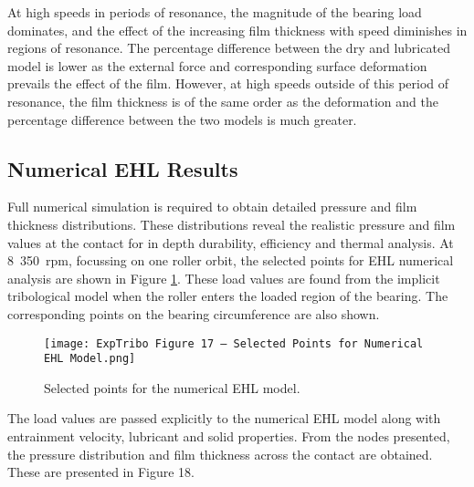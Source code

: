 At high speeds in periods of resonance, the magnitude of the bearing load dominates, and the effect of the increasing film thickness with speed diminishes in regions of resonance. The percentage difference between the dry and lubricated model is lower as the external force and corresponding surface deformation prevails the effect of the film. However, at high speeds outside of this period of resonance, the film thickness is of the same order as the deformation and the percentage difference between the two models is much greater.  

\subsection{Numerical EHL Results}

Full numerical simulation is required to obtain detailed pressure and film thickness distributions. These distributions reveal the realistic pressure and film values at the contact for in depth durability, efficiency and thermal analysis. At 8~350~rpm, focussing on one roller orbit, the selected points for EHL numerical analysis are shown in Figure \ref{Selected points for the numerical EHL model}. These load values are found from the implicit tribological model when the roller enters the loaded region of the bearing. The corresponding points on the bearing circumference are also shown. 

\begin{figure}
	\centering
	\texttt{[image: ExpTribo Figure 17 – Selected Points for Numerical EHL Model.png]}
	\caption{Selected points for the numerical EHL model.}
	\label{Selected points for the numerical EHL model}
\end{figure} 

The load values are passed explicitly to the numerical EHL model along with entrainment velocity, lubricant and solid properties. From the nodes presented, the pressure distribution and film thickness across the contact are obtained. These are presented in Figure 18.

